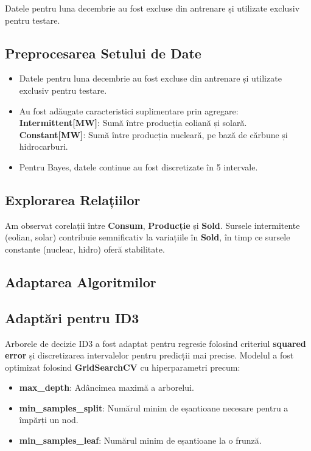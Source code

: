 \documentclass[a4paper,12pt]{article}
\begin{document}
Datele pentru luna decembrie au fost excluse din antrenare și utilizate exclusiv pentru testare.

\subsection{Preprocesarea Setului de Date}
\begin{itemize}
    \item Datele pentru luna decembrie au fost excluse din antrenare și utilizate exclusiv pentru testare.
    \item Au fost adăugate caracteristici suplimentare prin agregare: \\
    \textbf{Intermittent[MW]}: Sumă între producția eoliană și solară. \\
    \textbf{Constant[MW]}: Sumă între producția nucleară, pe bază de cărbune și hidrocarburi.
    \item Pentru Bayes, datele continue au fost discretizate în 5 intervale.
\end{itemize}

\subsection{Explorarea Relațiilor}
Am observat corelații între \textbf{Consum}, \textbf{Producție} și \textbf{Sold}. Sursele intermitente (eolian, solar) contribuie semnificativ la variațiile în \textbf{Sold}, în timp ce sursele constante (nuclear, hidro) oferă stabilitate.

\subsection{Adaptarea Algoritmilor}
\subsection*{Adaptări pentru ID3}
Arborele de decizie ID3 a fost adaptat pentru regresie folosind criteriul \textbf{squared error} și discretizarea intervalelor pentru predicții mai precise. Modelul a fost optimizat folosind \textbf{GridSearchCV} cu hiperparametri precum:
\begin{itemize}
    \item \textbf{max\_depth}: Adâncimea maximă a arborelui.
    \item \textbf{min\_samples\_split}: Numărul minim de eșantioane necesare pentru a împărți un nod.
    \item \textbf{min\_samples\_leaf}: Numărul minim de eșantioane la o frunză.
\end{itemize}
\end{document}
